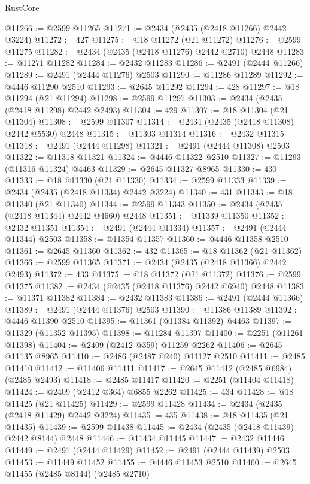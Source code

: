 \begin{lexlean}{RustCore}
\begin{coremodule}
@11266 := @2599 @11265
@11271 := @2434 (@2435 (@2418 @11266) @2442 @3224)
@11272 := 427
@11275 := @18 @11272 (@21 @11272)
@11276 := @2599 @11275
@11282 := @2434 (@2435 (@2418 @11276) @2442 @2710) @2448
@11283 := @11271 @11282
@11284 := @2432 @11283
@11286 := @2491 (@2444 @11266)
@11289 := @2491 (@2444 @11276) @2503
@11290 := @11286 @11289
@11292 := @4446 @11290 @2510
@11293 := @2645 @11292
@11294 := 428
@11297 := @18 @11294 (@21 @11294)
@11298 := @2599 @11297
@11303 := @2434 (@2435 (@2418 @11298) @2442 @2493)
@11304 := 429
@11307 := @18 @11304 (@21 @11304)
@11308 := @2599 @11307
@11314 := @2434 (@2435 (@2418 @11308) @2442 @5530) @2448
@11315 := @11303 @11314
@11316 := @2432 @11315
@11318 := @2491 (@2444 @11298)
@11321 := @2491 (@2444 @11308) @2503
@11322 := @11318 @11321
@11324 := @4446 @11322 @2510
@11327 := @11293 (@11316 @11324) @4463
@11329 := @2645 @11327 @8965
@11330 := 430
@11333 := @18 @11330 (@21 @11330)
@11334 := @2599 @11333
@11339 := @2434 (@2435 (@2418 @11334) @2442 @3224)
@11340 := 431
@11343 := @18 @11340 (@21 @11340)
@11344 := @2599 @11343
@11350 := @2434 (@2435 (@2418 @11344) @2442 @4660) @2448
@11351 := @11339 @11350
@11352 := @2432 @11351
@11354 := @2491 (@2444 @11334)
@11357 := @2491 (@2444 @11344) @2503
@11358 := @11354 @11357
@11360 := @4446 @11358 @2510
@11361 := @2645 @11360
@11362 := 432
@11365 := @18 @11362 (@21 @11362)
@11366 := @2599 @11365
@11371 := @2434 (@2435 (@2418 @11366) @2442 @2493)
@11372 := 433
@11375 := @18 @11372 (@21 @11372)
@11376 := @2599 @11375
@11382 := @2434 (@2435 (@2418 @11376) @2442 @6940) @2448
@11383 := @11371 @11382
@11384 := @2432 @11383
@11386 := @2491 (@2444 @11366)
@11389 := @2491 (@2444 @11376) @2503
@11390 := @11386 @11389
@11392 := @4446 @11390 @2510
@11395 := @11361 (@11384 @11392) @4463
@11397 := @11329 (@11352 @11395)
@11398 := @11284 @11397
@11400 := @2251 (@11261 @11398)
@11404 := @2409 (@2412 @359) @11259 @2262
@11406 := @2645 @11135 @8965
@11410 := @2486 (@2487 @240) @11127 @2510
@11411 := @2485 @11410
@11412 := @11406 @11411
@11417 := @2645 @11412 (@2485 @6984) (@2485 @2493)
@11418 := @2485 @11417
@11420 := @2251 (@11404 @11418)
@11424 := @2409 (@2412 @364) @6855 @2262
@11425 := 434
@11428 := @18 @11425 (@21 @11425)
@11429 := @2599 @11428
@11434 := @2434 (@2435 (@2418 @11429) @2442 @3224)
@11435 := 435
@11438 := @18 @11435 (@21 @11435)
@11439 := @2599 @11438
@11445 := @2434 (@2435 (@2418 @11439) @2442 @8144) @2448
@11446 := @11434 @11445
@11447 := @2432 @11446
@11449 := @2491 (@2444 @11429)
@11452 := @2491 (@2444 @11439) @2503
@11453 := @11449 @11452
@11455 := @4446 @11453 @2510
@11460 := @2645 @11455 (@2485 @8144) (@2485 @2710)

\end{coremodule}
\end{lexlean}

